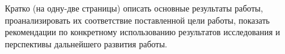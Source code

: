 \chapter*{}

Кратко (на одну-две страницы) описать основные результаты работы, проанализировать их соответствие поставленной цели работы, показать рекомендации по конкретному использованию результатов исследования и перспективы дальнейшего развития работы.